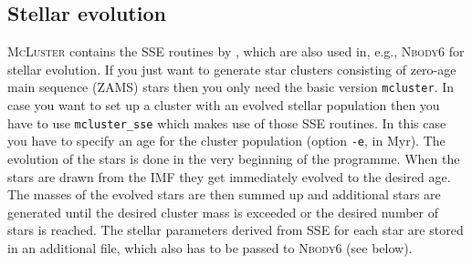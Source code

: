\documentclass[useAMS,usenatbib]{mn2e}
\begin{document}
\subsection*{Stellar evolution}
\textsc{McLuster} contains the \textsc{SSE} routines by \citet{Hurley00}, which are also used in, e.g., \textsc{Nbody6} for stellar evolution. If you just want to generate star clusters consisting of zero-age main sequence (ZAMS) stars then you only need the basic version \texttt{mcluster}. In case you want to set up a cluster with an evolved stellar population then you have to use \texttt{mcluster\_sse} which makes use of those \textsc{SSE} routines. In this case you have to specify an age for the cluster population (option \texttt{-e}, in Myr). The evolution of the stars is done in the very beginning of the programme. When the stars are drawn from the IMF they get immediately evolved to the desired age. The masses of the evolved stars are then summed up and additional stars are generated until the desired cluster mass is exceeded or the desired number of stars is reached. The stellar parameters derived from \textsc{SSE} for each star are stored in an additional file, which also has to be passed to \textsc{Nbody6} (see below).
\end{document}
